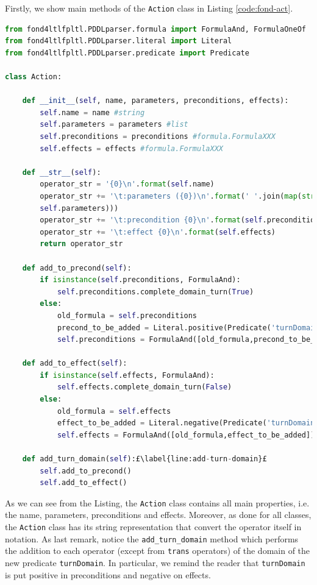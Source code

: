 Firstly, we show main methods of the \texttt{Action} class in Listing \ref{code:fond-act}.

\begin{lstlisting}[language=Python, style=Python, escapechar = £,  label={code:fond-act}, caption={The \texttt{Action} class.}]
from fond4ltlfpltl.PDDLparser.formula import FormulaAnd, FormulaOneOf
from fond4ltlfpltl.PDDLparser.literal import Literal
from fond4ltlfpltl.PDDLparser.predicate import Predicate

class Action:

    def __init__(self, name, parameters, preconditions, effects):
        self.name = name #string
        self.parameters = parameters #list
        self.preconditions = preconditions #formula.FormulaXXX
        self.effects = effects #formula.FormulaXXX

    def __str__(self):
        operator_str = '{0}\n'.format(self.name)
        operator_str += '\t:parameters ({0})\n'.format(' '.join(map(str, 
        self.parameters)))
        operator_str += '\t:precondition {0}\n'.format(self.preconditions)
        operator_str += '\t:effect {0}\n'.format(self.effects)
        return operator_str

    def add_to_precond(self):
        if isinstance(self.preconditions, FormulaAnd):
            self.preconditions.complete_domain_turn(True)
        else:
            old_formula = self.preconditions
            precond_to_be_added = Literal.positive(Predicate('turnDomain'))
            self.preconditions = FormulaAnd([old_formula,precond_to_be_added])

    def add_to_effect(self):
        if isinstance(self.effects, FormulaAnd):
            self.effects.complete_domain_turn(False)
        else:
            old_formula = self.effects
            effect_to_be_added = Literal.negative(Predicate('turnDomain'))
            self.effects = FormulaAnd([old_formula,effect_to_be_added])

    def add_turn_domain(self):£\label{line:add-turn-domain}£
        self.add_to_precond()
        self.add_to_effect()
\end{lstlisting}

As we can see from the Listing, the \texttt{Action} class contains all main properties, i.e. the name, parameters, preconditions and effects. Moreover, as done for all classes, the \texttt{Action} class has its string representation that convert the operator itself in \PDDL notation. As last remark, notice the \texttt{add\_turn\_domain} method which performs the addition to each operator (except from \texttt{trans} operators) of the domain of the new predicate \texttt{turnDomain}. In particular, we remind the reader that \texttt{turnDomain} is put positive in preconditions and negative on effects.

